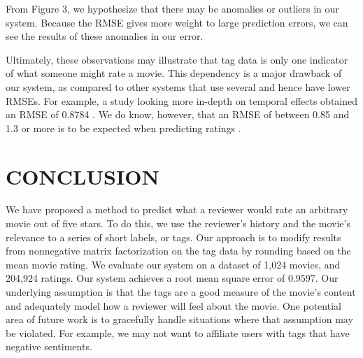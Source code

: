 \documentclass[letterpaper, 10 pt, conference]{ieeeconf}  %
\begin{document}
From Figure 3, we hypothesize that there may be anomalies or outliers in our system. Because the RMSE gives more weight to large prediction errors, we can see the results of these anomalies in our error.

Ultimately, these observations may illustrate that tag data is only one indicator of what someone might rate a movie. This dependency is a major drawback of our system, as compared to other systems that use several and hence have lower RMSEs. For example, a study looking more in-depth on temporal effects obtained an RMSE of 0.8784 \cite{netflix}. We do know, however, that an RMSE of between 0.85 and 1.3 or more is to be expected when predicting ratings \cite{netflix}.


\section{CONCLUSION}

We have proposed a method to predict what a reviewer would rate an arbitrary movie out of five stars. To do this, we use the reviewer's history and the movie's relevance to a series of short labels, or tags.
Our approach is to modify results from nonnegative matrix factorization on the tag data by rounding based on the mean movie rating. We evaluate our system on a dataset of 1,024 movies, and 204,924 ratings.
Our system achieves a root mean square error of 0.9597.
Our underlying assumption is that the tags are a good measure of the movie's content and adequately model how a reviewer will feel about the movie.
One potential area of future work is to gracefully handle situations where that assumption may be violated. For example, we may not want to affiliate users with tags that have negative sentiments.




\end{document}
